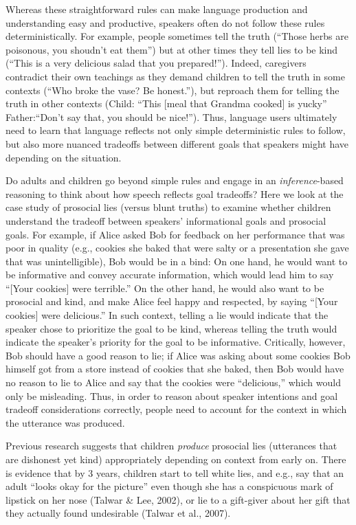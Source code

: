 \documentclass[oneside]{report}
\begin{document}
Whereas these straightforward rules can make language production and
understanding easy and productive, speakers often do not follow these
rules deterministically. For example, people sometimes tell the truth
(``Those herbs are poisonous, you shoudn't eat them'') but at other
times they tell lies to be kind (``This is a very delicious salad that
you prepared!''). Indeed, caregivers contradict their own teachings as
they demand children to tell the truth in some contexts (``Who broke the
vase? Be honest.''), but reproach them for telling the truth in other
contexts (Child: ``This {[}meal that Grandma cooked{]} is yucky''
Father:``Don't say that, you should be nice!''). Thus, language users
ultimately need to learn that language reflects not only simple
deterministic rules to follow, but also more nuanced tradeoffs between
different goals that speakers might have depending on the situation.

Do adults and children go beyond simple rules and engage in an
\emph{inference}-based reasoning to think about how speech reflects goal
tradeoffs? Here we look at the case study of prosocial lies (versus
blunt truths) to examine whether children understand the tradeoff
between speakers' informational goals and prosocial goals. For example,
if Alice asked Bob for feedback on her performance that was poor in
quality (e.g., cookies she baked that were salty or a presentation she
gave that was unintelligible), Bob would be in a bind: On one hand, he
would want to be informative and convey accurate information, which
would lead him to say ``{[}Your cookies{]} were terrible.'' On the other
hand, he would also want to be prosocial and kind, and make Alice feel
happy and respected, by saying ``{[}Your cookies{]} were delicious.'' In
such context, telling a lie would indicate that the speaker chose to
prioritize the goal to be kind, whereas telling the truth would indicate
the speaker's priority for the goal to be informative. Critically,
however, Bob should have a good reason to lie; if Alice was asking about
some cookies Bob himself got from a store instead of cookies that she
baked, then Bob would have no reason to lie to Alice and say that the
cookies were ``delicious,'' which would only be misleading. Thus, in
order to reason about speaker intentions and goal tradeoff
considerations correctly, people need to account for the context in
which the utterance was produced.

Previous research suggests that children \emph{produce} prosocial lies
(utterances that are dishonest yet kind) appropriately depending on
context from early on. There is evidence that by 3 years, children start
to tell white lies, and e.g., say that an adult ``looks okay for the
picture'' even though she has a conspicuous mark of lipstick on her nose
(Talwar \& Lee, 2002), or lie to a gift-giver about her gift that they
actually found undesirable (Talwar et al., 2007).
\end{document}
